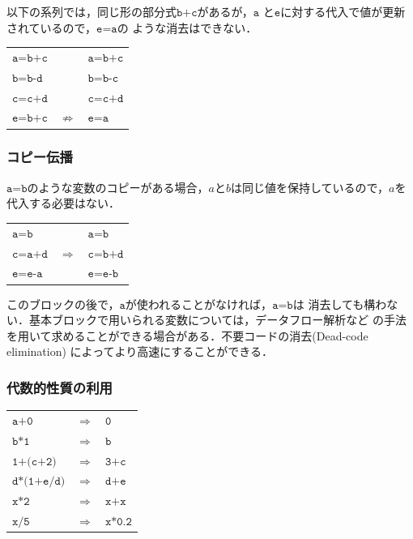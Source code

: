 \documentclass[dvipdfmx,a4j]{jbook}
\begin{document}
以下の系列では，同じ形の部分式$\texttt{b+c}$があるが，$\texttt{a}$
と$\texttt{e}$に対する代入で値が更新されているので，$\texttt{e=a}$の
ような消去はできない．

\begin{center}
    \begin{tabular}{lcl}
        $\texttt{a=b+c}$ &                   & $\texttt{a=b+c}$ \\
        $\texttt{b=b-d}$ &                   & $\texttt{b=b-c}$ \\
        $\texttt{c=c+d}$ &                   & $\texttt{c=c+d}$ \\
        $\texttt{e=b+c}$ & $\not\Rightarrow$ & $\texttt{e=a}$
    \end{tabular}
\end{center}

\subsubsection{コピー伝播}

$\texttt{a=b}$のような変数のコピーがある場合，$a$と$b$は同じ値を保持しているので，$a$を代入する必要はない．

\begin{center}
    \begin{tabular}{lcl}
        $\texttt{a=b}$   &               & $\texttt{a=b}$   \\
        $\texttt{c=a+d}$ & $\Rightarrow$ & $\texttt{c=b+d}$ \\
        $\texttt{e=e-a}$ &               & $\texttt{e=e-b}$
    \end{tabular}
\end{center}

このブロックの後で，$\texttt{a}$が使われることがなければ，$\texttt{a=b}$は
消去しても構わない．基本ブロックで用いられる変数については，データフロー解析など
の手法を用いて求めることができる場合がある．不要コードの消去(Dead-code elimination)
によってより高速にすることができる．

\subsubsection{代数的性質の利用}

\begin{center}
    \begin{tabular}{lcl}
        $\texttt{a+0}$       & $\Rightarrow$ & $\texttt{0}$     \\
        $\texttt{b*1}$       & $\Rightarrow$ & $\texttt{b}$     \\
        $\texttt{1+(c+2)}$   & $\Rightarrow$ & $\texttt{3+c}$   \\
        $\texttt{d*(1+e/d)}$ & $\Rightarrow$ & $\texttt{d+e}$   \\
        $\texttt{x*2}$       & $\Rightarrow$ & $\texttt{x+x}$   \\
        $\texttt{x/5}$       & $\Rightarrow$ & $\texttt{x*0.2}$ \\
    \end{tabular}
\end{center}
\end{document}
